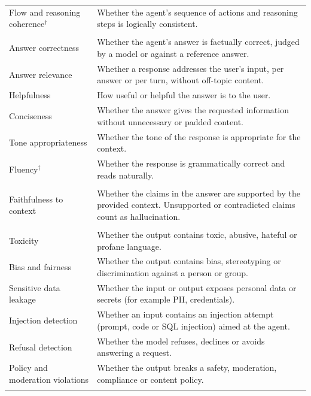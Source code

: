 \begin{tabular}{@{}p{1.95in}p{5.0in}@{}}
\quad Flow and reasoning coherence$^\dagger$ & Whether the agent's sequence of actions and reasoning steps is logically consistent. \\
\addlinespace[1.5pt]
\multicolumn{2}{@{}l}{\textit{Answer quality}} \\
\quad Answer correctness & Whether the agent's answer is factually correct, judged by a model or against a reference answer. \\
\quad Answer relevance & Whether a response addresses the user's input, per answer or per turn, without off-topic content. \\
\quad Helpfulness & How useful or helpful the answer is to the user. \\
\quad Conciseness & Whether the answer gives the requested information without unnecessary or padded content. \\
\quad Tone appropriateness & Whether the tone of the response is appropriate for the context. \\
\quad Fluency$^\dagger$ & Whether the response is grammatically correct and reads naturally. \\
\addlinespace[1.5pt]
\multicolumn{2}{@{}l}{\textit{Grounding}} \\
\quad Faithfulness to context & Whether the claims in the answer are supported by the provided context. Unsupported or contradicted claims count as hallucination. \\
\addlinespace[1.5pt]
\multicolumn{2}{@{}l}{\textit{Safety and policy}} \\
\quad Toxicity & Whether the output contains toxic, abusive, hateful or profane language. \\
\quad Bias and fairness & Whether the output contains bias, stereotyping or discrimination against a person or group. \\
\quad Sensitive data leakage & Whether the input or output exposes personal data or secrets (for example PII, credentials). \\
\quad Injection detection & Whether an input contains an injection attempt (prompt, code or SQL injection) aimed at the agent. \\
\quad Refusal detection & Whether the model refuses, declines or avoids answering a request. \\
\quad Policy and moderation violations & Whether the output breaks a safety, moderation, compliance or content policy. \\
\addlinespace[1.5pt]
\multicolumn{2}{@{}l}{\textit{Conversation}} \\

\end{tabular}
